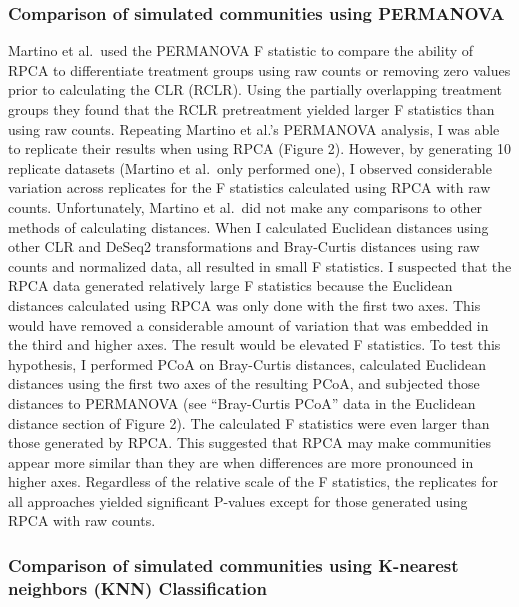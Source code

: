 \documentclass[
  11pt,
]{article}
\begin{document}
\subsubsection{Comparison of simulated communities using
PERMANOVA}\label{comparison-of-simulated-communities-using-permanova}

Martino et al.~used the PERMANOVA F statistic to compare the ability of
RPCA to differentiate treatment groups using raw counts or removing zero
values prior to calculating the CLR (RCLR). Using the partially
overlapping treatment groups they found that the RCLR pretreatment
yielded larger F statistics than using raw counts. Repeating Martino et
al.'s PERMANOVA analysis, I was able to replicate their results when
using RPCA (Figure 2). However, by generating 10 replicate datasets
(Martino et al.~only performed one), I observed considerable variation
across replicates for the F statistics calculated using RPCA with raw
counts. Unfortunately, Martino et al.~did not make any comparisons to
other methods of calculating distances. When I calculated Euclidean
distances using other CLR and DeSeq2 transformations and Bray-Curtis
distances using raw counts and normalized data, all resulted in small F
statistics. I suspected that the RPCA data generated relatively large F
statistics because the Euclidean distances calculated using RPCA was
only done with the first two axes. This would have removed a
considerable amount of variation that was embedded in the third and
higher axes. The result would be elevated F statistics. To test this
hypothesis, I performed PCoA on Bray-Curtis distances, calculated
Euclidean distances using the first two axes of the resulting PCoA, and
subjected those distances to PERMANOVA (see ``Bray-Curtis PCoA'' data in
the Euclidean distance section of Figure 2). The calculated F statistics
were even larger than those generated by RPCA. This suggested that RPCA
may make communities appear more similar than they are when differences
are more pronounced in higher axes. Regardless of the relative scale of
the F statistics, the replicates for all approaches yielded significant
P-values except for those generated using RPCA with raw counts.

\subsubsection{Comparison of simulated communities using K-nearest
neighbors (KNN)
Classification}\label{comparison-of-simulated-communities-using-k-nearest-neighbors-knn-classification}
\end{document}
